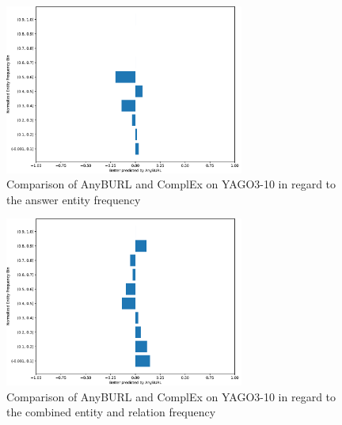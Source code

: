 \begin{figure}[H]
\centering
\includegraphics[width=0.7\textwidth]{images/entity_freq_answer_anyburl_complex_yago.PNG}
\caption{Comparison of AnyBURL and ComplEx on YAGO3-10 in regard to the answer entity frequency}
\label{fig:entity_answer_tail_anyburl_complex_yago}
\end{figure}

\begin{figure}[H]
\centering
\includegraphics[width=0.7\textwidth]{images/combined_freq_anyburl_complex_yago.PNG}
\caption{Comparison of AnyBURL and ComplEx on YAGO3-10 in regard to the combined entity and relation frequency}
\label{fig:combined_freq_anyburl_complex_yago}
\end{figure}